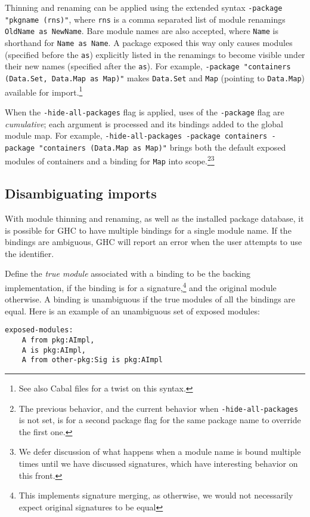 \documentclass{article}
\begin{document}
Thinning and renaming can be applied
using the extended syntax \verb|-package "pkgname (rns)"|, where \texttt{rns} is a comma separated list of
module renamings \texttt{OldName as NewName}.  Bare module names are
also accepted, where \texttt{Name} is shorthand for \texttt{Name as
Name}.  A package exposed this way only causes modules (specified before
the \texttt{as}) explicitly listed in the renamings to become visible
under their new names (specified after the \texttt{as}).  For example,
\verb|-package "containers (Data.Set, Data.Map as Map)"| makes
\texttt{Data.Set} and \texttt{Map} (pointing to
\texttt{Data.Map}) available for import.\footnote{See also Cabal files
for a twist on this syntax.}

When the \texttt{-hide-all-packages} flag is applied, uses of the
\texttt{-package} flag are \emph{cumulative}; each argument is processed
and its bindings added to the global module map.  For example,
\verb|-hide-all-packages -package containers -package "containers (Data.Map as Map)"| brings both the default exposed modules of
containers and a binding for \texttt{Map} into scope.\footnote{The
previous behavior, and the current behavior when
\texttt{-hide-all-packages} is not set, is for a second package flag for
the same package name to override the first one.}\footnote{We defer
discussion of what happens when a module name is bound multiple times until
we have discussed signatures, which have interesting behavior on this front.}

\subsection{Disambiguating imports}

With module thinning and renaming, as well as the installed package
database, it is possible for GHC to have multiple bindings for a single
module name.  If the bindings are ambiguous, GHC will report an error
when the user attempts to use the identifier.

Define the \emph{true module} associated with a binding to be the
backing implementation, if the binding is for a signature,\footnote{This
implements signature merging, as otherwise, we would not necessarily
expect original signatures to be equal} and the original module
otherwise.  A binding is unambiguous if the true modules of all the
bindings are equal.  Here is an example of an unambiguous set of exposed
modules:

\begin{verbatim}
exposed-modules:
    A from pkg:AImpl,
    A is pkg:AImpl,
    A from other-pkg:Sig is pkg:AImpl
\end{verbatim}
\end{document}
